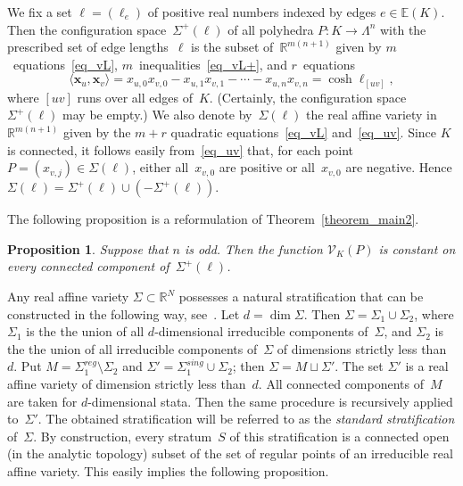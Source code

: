 \documentclass[reqno,tbtags,12pt]{amsart}
\numberwithin{equation}{section}
\newcommand{\R}{\mathbb{R}}
\newcommand{\E}{\mathbb{E}}
\newcommand{\CV}{\mathcal{V}}
\newcommand{\bx}{\mathbf{x}}
\newcommand{\bell}{\boldsymbol{\ell}}
\newtheorem{propos}[theorem]{Proposition}
\theoremstyle{definition}
\begin{document}
We fix a set $\bell=(\ell_e)$ of positive real numbers indexed by edges $e\in\E(K)$. 
Then the configuration space~$\Sigma^+(\bell)$ of all polyhedra $ P\colon K\to\Lambda^n$ with the prescribed set of edge lengths~$\bell$ is the subset of~$\R^{m(n+1)}$ given by $m$~equations~\eqref{eq_vL}, $m$~inequalities~\eqref{eq_vL+}, and $r$~equations
\begin{equation}
\langle\bx_u,\bx_v\rangle=x_{u,0}x_{v,0}-x_{u,1}x_{v,1}-\cdots-x_{u,n}x_{v,n}=\cosh\ell_{[uv]},\label{eq_uv}
\end{equation}
where $[uv]$ runs over all edges of~$K$. (Certainly, the configuration space~$\Sigma^+(\bell)$ may be empty.) We also denote by~$\Sigma(\bell)$ the real affine variety in~$\R^{m(n+1)}$ given by the $m+r$ quadratic equations~\eqref{eq_vL} and~\eqref{eq_uv}. Since $K$ is connected, it follows easily from~\eqref{eq_uv} that, for each point $ P=(x_{v,j})\in\Sigma(\bell)$, either all~$x_{v,0}$ are positive or all~$x_{v,0}$ are negative. Hence $\Sigma(\bell)=\Sigma^+(\bell)\cup(-\Sigma^+(\bell))$.

The following proposition is a reformulation of Theorem~\ref{theorem_main2}.


\begin{propos}\label{propos_const0}
Suppose that $n$ is odd. Then the function $\CV_K( P)$ is constant on every connected component of\/~$\Sigma^+(\bell)$.
\end{propos} 





Any real affine variety $\Sigma\subset\R^N$ possesses a natural stratification that can be constructed in the following way, see~\cite[Sect.~11(b)]{Whi57}. Let $d=\dim\Sigma$. Then $\Sigma=\Sigma_1\cup\Sigma_2$, where $\Sigma_1$ is the the union of all $d$-dimensional irreducible components of~$\Sigma$, and $\Sigma_2$ is the the union of all irreducible components of~$\Sigma$ of dimensions strictly less than~$d$. Put $M=\Sigma^{reg}_1\setminus\Sigma_2$ and $\Sigma'=\Sigma^{sing}_1\cup\Sigma_2$; then $\Sigma=M\sqcup\Sigma'$. The set $\Sigma'$ is a real affine variety of dimension strictly less than~$d$. All connected components of~$M$ are taken for $d$-dimensional stata. Then the same procedure is recursively applied to~$\Sigma'$. The obtained stratification will be referred to as the \textit{standard stratification\/} of~$\Sigma$. By construction, every stratum~$S$ of this stratification is a connected open (in the analytic topology) subset of the set of regular points of an irreducible real affine variety. This easily implies the following proposition.
\end{document}
